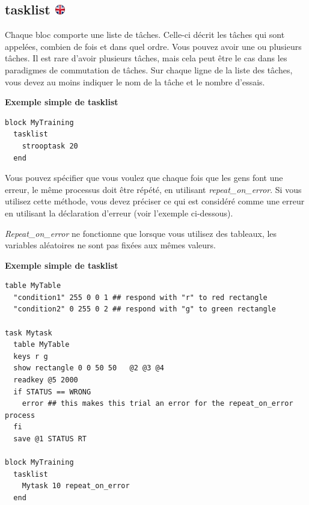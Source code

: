 \documentclass[
]{book}
\begin{document}
\hypertarget{tasklist}{%
\subsection[tasklist ]{\texorpdfstring{tasklist \href{https://www.psytoolkit.org/doc3.4.0/syntax.html\#block-tasklist}{\protect\includegraphics{img/ukflag.png}}}{tasklist }}\label{tasklist}}

Chaque bloc comporte une liste de tâches. Celle-ci décrit les tâches qui sont appelées, combien de fois et dans quel ordre. Vous pouvez avoir une ou plusieurs tâches. Il est rare d'avoir plusieurs tâches, mais cela peut être le cas dans les paradigmes de commutation de tâches. Sur chaque ligne de la liste des tâches, vous devez au moins indiquer le nom de la tâche et le nombre d'essais.

\textbf{Exemple simple de tasklist}

\begin{verbatim}
block MyTraining
  tasklist
    strooptask 20
  end
\end{verbatim}

Vous pouvez spécifier que vous voulez que chaque fois que les gens font une erreur, le même processus doit être répété, en utilisant \emph{repeat\_on\_error}. Si vous utilisez cette méthode, vous devez préciser ce qui est considéré comme une erreur en utilisant la déclaration d'erreur (voir l'exemple ci-dessous).

\emph{Repeat\_on\_error} ne fonctionne que lorsque vous utilisez des tableaux, les variables aléatoires ne sont pas fixées aux mêmes valeurs.

\textbf{Exemple simple de tasklist}

\begin{verbatim}
table MyTable
  "condition1" 255 0 0 1 ## respond with "r" to red rectangle
  "condition2" 0 255 0 2 ## respond with "g" to green rectangle

task Mytask
  table MyTable
  keys r g
  show rectangle 0 0 50 50   @2 @3 @4
  readkey @5 2000
  if STATUS == WRONG
    error ## this makes this trial an error for the repeat_on_error process
  fi
  save @1 STATUS RT

block MyTraining
  tasklist
    Mytask 10 repeat_on_error
  end
\end{verbatim}
\end{document}
